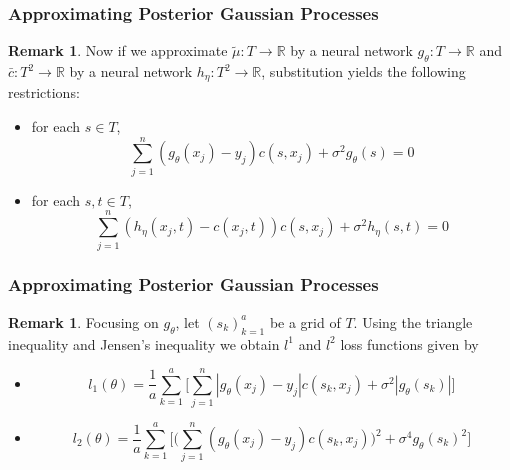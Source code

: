 \documentclass[notheorems]{beamer}
\theoremstyle{definition}
\newtheorem{rem}[definition]{Remark}
\newcommand{\sig}{\sigma}
\newcommand{\R}{\mathbb{R}}
\begin{document}
\begin{frame}
\frametitle{Approximating Posterior Gaussian Processes}
\begin{rem}
Now if we approximate $\tilde{\mu}: T \rightarrow \R$ by a neural network $g_{\theta}: T \rightarrow \R$ and $\bar{c}:T^2 \rightarrow \R$ by a neural network $h_{\eta}:T^2 \rightarrow \R$, 
substitution yields the following restrictions:
\begin{itemize}
\item for each $s \in T$, 
$$\sum_{j=1}^n (g_{\theta}(x_j)- y_j) c(s, x_j) + \sig^2 g_{\theta}(s)  = 0$$
\item for each $s,t \in T$,
$$\sum_{j=1}^n (h_{\eta}(x_j, t)- c(x_j,t)) c(s,x_j) + \sig^2 h_{\eta}(s, t) = 0$$
\end{itemize}
\end{rem}

\end{frame}
















\begin{frame}
\frametitle{Approximating Posterior Gaussian Processes}
\begin{rem}
Focusing on $g_{\theta}$, let $(s_k)_{k=1}^a$ be a grid of $T$. Using the triangle inequality and Jensen's inequality we obtain $l^1$ and $l^2$ loss functions given by
\begin{itemize}
\item 
$$l_1(\theta) = \frac{1}{a} \sum_{k=1}^a \bigg[ \sum_{j=1}^n |g_{\theta}(x_j)- y_j| c(s_k, x_j) + \sig^2 |g_{\theta}(s_k)| \bigg] $$
\item $$l_2(\theta) = \frac{1}{a}\sum\limits_{k=1}^a \bigg[ \bigg (\sum\limits_{j=1}^n (g_{\theta}(x_j) - y_j)c(s_k, x_j)\bigg)^2 + \sig^4 g_{\theta}(s_k)^2\bigg]$$ 
\end{itemize}
\end{rem}

\end{frame}
\end{document}
